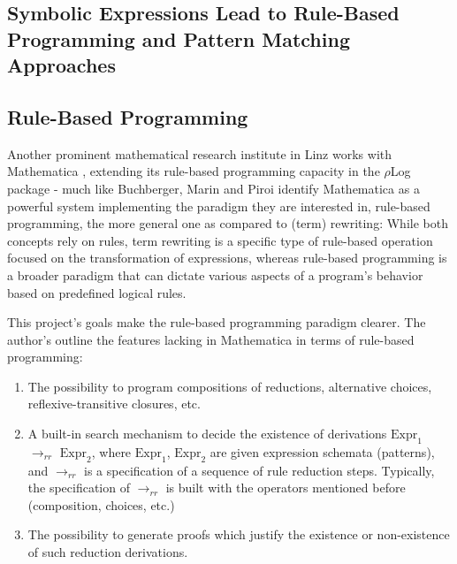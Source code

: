 \subsection{Symbolic Expressions Lead to Rule-Based Programming and Pattern Matching Approaches} \label{symbolic-expressions}

\subsection{Rule-Based Programming}

Another prominent mathematical research institute in Linz works with Mathematica \cite{noauthor_institute_nodate}, extending its rule-based programming capacity in the $\rho$Log package \cite{marin_rule-based_nodate} - much like Buchberger, Marin and Piroi identify Mathematica as a powerful system implementing the paradigm they are interested in, rule-based programming, the more general one as compared to (term) rewriting: While both concepts rely on rules, term rewriting is a specific type of rule-based operation focused on the transformation of expressions, whereas rule-based programming is a broader paradigm that can dictate various aspects of a program's behavior based on predefined logical rules.

This project's goals make the rule-based programming paradigm clearer. The author's outline the features lacking in Mathematica in terms of rule-based programming:

\begin{center}
    \begin{displayquote}
    \begin{enumerate}
        \item The possibility to program compositions of reductions, alternative choices, reflexive-transitive closures, etc.
        \item A built-in search mechanism to decide the existence of derivations $\text{Expr}_1$ $\rightarrow_{rr}$ $\text{Expr}_2$, where $\text{Expr}_1$, $\text{Expr}_2$ are given expression schemata (patterns), and $\rightarrow_{rr}$ is a specification of a sequence of rule reduction steps. Typically, the specification of $\rightarrow_{rr}$ is built with the operators mentioned before (composition, choices, etc.)
        \item The possibility to generate proofs which justify the existence or non-existence of such reduction derivations.
    \end{enumerate}
        \cite{marin_rule-based_nodate}
    \end{displayquote} 
\end{center}

